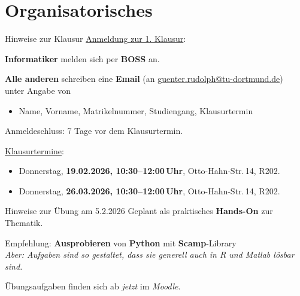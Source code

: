 \section{Organisatorisches}

\begin{frame}{Hinweise zur Klausur}
	\underline{Anmeldung zur 1. Klausur}:\\\smallskip
	
	\textbf{Informatiker} melden sich per \textbf{BOSS} an.
	\medskip
	
	\textbf{Alle anderen} schreiben eine \textbf{Email} (an \url{guenter.rudolph@tu-dortmund.de})\\
	unter Angabe von\\
	
	\begin{itemize}
		\item Name, Vorname, Matrikelnummer, Studiengang, Klausurtermin\\
	\end{itemize}
	
	\bigskip
	Anmeldeschluss: 7 Tage vor dem Klausurtermin.\\
	\bigskip
	
	\underline{Klausurtermine}:\\\smallskip
	\begin{itemize}
		\item Donnerstag, \textbf{19.02.2026, 10:30--12:00\,Uhr}, Otto-Hahn-Str.\,14, R202.
		\item Donnerstag, \textbf{26.03.2026, 10:30--12:00\,Uhr}, Otto-Hahn-Str.\,14, R202.
	\end{itemize}
\end{frame}

\begin{frame}{Hinweise zur Übung am 5.2.2026}
Geplant als praktisches \textbf{Hands-On} zur Thematik.\\
\bigskip

Empfehlung: \textbf{Ausprobieren} von \textbf{Python} mit \textbf{Scamp}-Library\\

{\small\itshape Aber: Aufgaben sind so gestaltet, dass sie generell auch in R und Matlab lösbar sind.}\\
\bigskip

Übungsaufgaben finden sich ab \emph{jetzt} im \emph{Moodle}.
\bigskip

\end{frame}
